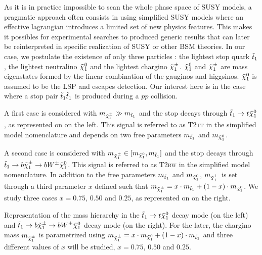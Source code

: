         As it is in practice impossible to scan the whole phase space of SUSY models, a
        pragmatic approach often consists in using simplified SUSY models where an
        effective lagrangian introduces a limited set of new physics features. This makes
        it possibles for experimental searches to produced generic results that can later
        be reinterpreted in specific realization of SUSY \cite{LiemSMS, SmodelS}
        or other BSM theories. In our case, we postulate the existence of only three
        particles : the lightest stop quark $\tilde{t}_1$, the lightest neutralino $\tilde{\chi}_1^0$
        and the lightest chargino $\tilde{\chi}_1^\pm$. $\tilde{\chi}_1^0$ and $\tilde{\chi}_1^\pm$ are mass
        eigenstates formed by the linear combination of the gauginos and  higgsinos.
        $\tilde{\chi}_1^0$ is assumed to be the LSP and escapes detection. Our interest here
        is in the case where a stop pair $\tilde{t}_1\tilde{t}_1$ is produced during a $pp$ collision.

        A first case is considered with $m_{\tilde{\chi}_1^\pm} \gg m_{\tilde{t}_1}$ and the stop
        decays through $\tilde{t}_1 \rightarrow t \tilde{\chi}_1^0$, as represented on
         on the left. This signal is referred to as \textsc{T2tt}
        in the simplified model nomenclature and depends on two free parameters
        $m_{\tilde{t}_1}$ and $m_{\tilde{\chi}_1^0}$.

        A second case is considered with $m_{\tilde{\chi}_1^\pm} \in [m_{\tilde{\chi}_1^0},
        m_{\tilde{t}_1}]$ and the stop decays through $\tilde{t}_1 \rightarrow b \tilde{\chi}_1^\pm
        \rightarrow b W^{\pm} \tilde{\chi}_1^0$. This signal is referred to as \textsc{T2bw}
        in the simplified model nomenclature. In addition to the free  parameters
        $m_{\tilde{t}_1}$ and $m_{\tilde{\chi}_1^0}$, $m_{\tilde{\chi}_1^\pm}$ is set through a
        third parameter $x$ defined such that $m_{\tilde{\chi}_1^\pm} = x \cdot m_{\tilde{t}_1}
        + (1 - x) \cdot m_{\tilde{\chi}_1^0}$. We study three cases $x = 0.75$, $0.50$
        and $0.25$, as represented on  on the right.

                     {Representation of the mass hierarchy in the $\tilde{t}_1 \rightarrow t
                     \tilde{\chi}_1^0$ decay mode (on the left) and $\tilde{t}_1 \rightarrow b
                     \tilde{\chi}_1^\pm \rightarrow b W^{\pm} \tilde{\chi}_1^0 $ decay mode (on the
                     right). For the later, the chargino mass $m_{\tilde{\chi}_1^\pm}$ is
                     parametrized using $m_{\tilde{\chi}_1^\pm} = x \cdot m_{\tilde{\chi}_1^0}
                     + (1 - x) \cdot m_{\tilde{t}_1}$ and three different values of $x$ will
                     be studied, $x = 0.75$, $0.50$ and $0.25$.}

